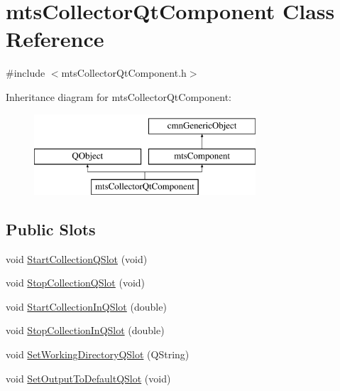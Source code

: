 \hypertarget{classmts_collector_qt_component}{}\section{mts\+Collector\+Qt\+Component Class Reference}
\label{classmts_collector_qt_component}


{\ttfamily \#include $<$mts\+Collector\+Qt\+Component.\+h$>$}

Inheritance diagram for mts\+Collector\+Qt\+Component\+:\begin{figure}[H]
\begin{center}
\leavevmode
\includegraphics[height=3.000000cm]{db/d7d/classmts_collector_qt_component}
\end{center}
\end{figure}
\subsection*{Public Slots}
\begin{DoxyCompactItemize}
\item 
void \hyperlink{classmts_collector_qt_component_a629ac8e81a8cd7056d99ec812da2c444}{Start\+Collection\+Q\+Slot} (void)
\item 
void \hyperlink{classmts_collector_qt_component_afdde2c1e32019418355cfd56158af173}{Stop\+Collection\+Q\+Slot} (void)
\item 
void \hyperlink{classmts_collector_qt_component_a2ba72b7f73c44e84817a329336768173}{Start\+Collection\+In\+Q\+Slot} (double)
\item 
void \hyperlink{classmts_collector_qt_component_a4cc743aaa5f51cb6a820e399517994c4}{Stop\+Collection\+In\+Q\+Slot} (double)
\item 
void \hyperlink{classmts_collector_qt_component_a6091a557d5527764ed75d937a1d59ef5}{Set\+Working\+Directory\+Q\+Slot} (Q\+String)
\item 
void \hyperlink{classmts_collector_qt_component_a2cdff243e23b974c17381c406da4c1b8}{Set\+Output\+To\+Default\+Q\+Slot} (void)
\end{DoxyCompactItemize}
